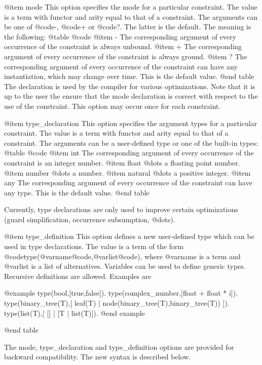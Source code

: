 {	@item mode
This option specifies the mode for a particular constraint. The
value is a term with functor and arity equal to that of a constraint.
The arguments can be one of @code{-}, @code{+} or @code{?}.
The latter is the default. The meaning is the following:
	@table @code
	@item -
         The corresponding argument of every occurrence
	of the constraint is always unbound.
	@item + 
        The corresponding argument of every occurrence
	of the constraint is always ground.
	@item ?
         The corresponding argument of every occurrence
	of the constraint can have any instantiation, which may change
	over time. This is the default value.
	@end table
The declaration is used by the compiler for various optimizations. 
Note that it is up to the user the ensure that the mode declaration
is correct with respect to the use of the constraint.
This option may occur once for each constraint.

	@item type_declaration
This option specifies the argument types for a particular constraint. The
value is a term with functor and arity equal to that of a constraint.
The arguments can be a user-defined type or one of
the built-in types:
    @table @code
	@item int
         The corresponding argument of every occurrence
	of the constraint is an integer number.
	@item float
         @dots{} a floating point number.
	@item number
         @dots{} a number.
	@item natural
         @dots{} a positive integer.
	@item any
         The corresponding argument of every occurrence
	of the constraint can have any type. This is the default value.
   @end table

Currently, type declarations are only used to improve certain
optimizations (guard simplification, occurrence subsumption, @dots{}).

	@item type_definition
This option defines a new user-defined type which can be used in
type declarations. The value is a term of the form
@code{type(}@var{name}@code{,}@var{list}@code{)}, where
@var{name} is a term and @var{list} is a list of alternatives.
Variables can be used to define generic types. Recursive definitions
are allowed. Examples are 

@example
type(bool,[true,false]).
type(complex_number,[float + float * i]).
type(binary_tree(T),[ leaf(T) | node(binary_tree(T),binary_tree(T)) ]).
type(list(T),[ [] | [T | list(T)]).
@end example


@end table

The mode, type_declaration and type_definition options are provided
for backward compatibility. The new syntax is described below.

}
